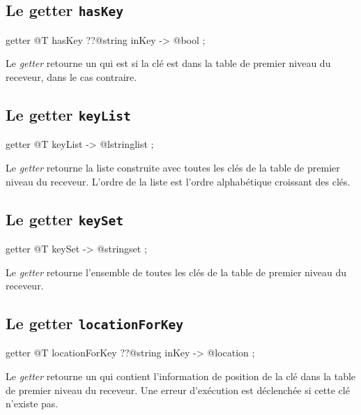 \subsection{Le getter \texttt{hasKey}}

\begin{galgascode}
getter @T hasKey ??@string inKey -> @bool ;
\end{galgascode}


Le \emph{getter}  retourne un  qui est  si la clé  est dans la table de premier niveau du receveur,  dans le cas contraire.



\subsection{Le getter \texttt{keyList}}

\begin{galgascode}
getter @T keyList -> @lstringlist ;
\end{galgascode}


Le \emph{getter}  retourne la liste construite avec toutes les clés de la table de premier niveau du receveur. L'ordre de la liste est l'ordre alphabétique croissant des clés.



\subsection{Le getter \texttt{keySet}}

\begin{galgascode}
getter @T keySet -> @stringset ;
\end{galgascode}


Le \emph{getter}  retourne l'ensemble de toutes les clés de la table de premier niveau du receveur.





\subsection{Le getter \texttt{locationForKey}}

\begin{galgascode}
getter @T locationForKey ??@string inKey -> @location ;
\end{galgascode}


Le \emph{getter}  retourne un  qui contient l'information de position de la clé  dans la table de premier niveau du receveur. Une erreur d'exécution est déclenchée si cette clé n'existe pas.








